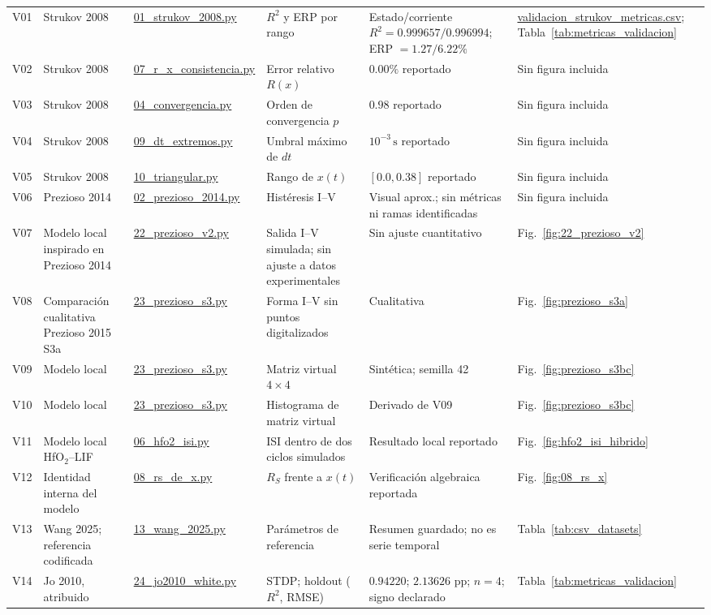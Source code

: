 {\begin{longtable}{c >{\raggedright\arraybackslash}p{2.1cm} >{\raggedright\arraybackslash}p{2.4cm} >{\raggedright\arraybackslash}p{2.0cm} >{\raggedright\arraybackslash}p{4.1cm} >{\raggedright\arraybackslash}p{2.2cm}}
V01 & Strukov 2008 & \url{01_strukov_2008.py} & $R^2$ y ERP por rango & Estado/corriente $R^2=0.999657/0.996994$; ERP $=1.27/6.22\%$ & \url{validacion_strukov_metricas.csv}; Tabla~\ref{tab:metricas_validacion} \\
V02 & Strukov 2008 & \url{07_r_x_consistencia.py} & Error relativo $R(x)$ & $0.00\%$ reportado & Sin figura incluida \\
V03 & Strukov 2008 & \url{04_convergencia.py} & Orden de convergencia $p$ & $0.98$ reportado & Sin figura incluida \\
V04 & Strukov 2008 & \url{09_dt_extremos.py} & Umbral máximo de $dt$ & $10^{-3}\,\mathrm{s}$ reportado & Sin figura incluida \\
V05 & Strukov 2008 & \url{10_triangular.py} & Rango de $x(t)$ & $[0.0,0.38]$ reportado & Sin figura incluida \\
V06 & Prezioso 2014 & \url{02_prezioso_2014.py} & Histéresis I--V & Visual aprox.; sin métricas ni ramas identificadas & Sin figura incluida \\
V07 & Modelo local inspirado en Prezioso 2014 & \url{22_prezioso_v2.py} & Salida I--V simulada; sin ajuste a datos experimentales & Sin ajuste cuantitativo & Fig.~\ref{fig:22_prezioso_v2} \\
V08 & Comparación cualitativa Prezioso 2015 S3a & \url{23_prezioso_s3.py} & Forma I--V sin puntos digitalizados & Cuali\-tativa & Fig.~\ref{fig:prezioso_s3a} \\
V09 & Modelo local & \url{23_prezioso_s3.py} & Matriz virtual $4\times4$ & Sintética; semilla 42 & Fig.~\ref{fig:prezioso_s3bc} \\
V10 & Modelo local & \url{23_prezioso_s3.py} & Histograma de matriz virtual & Derivado de V09 & Fig.~\ref{fig:prezioso_s3bc} \\
V11 & Modelo local HfO$_2$--LIF & \url{06_hfo2_isi.py} & ISI dentro de dos ciclos simulados & Resultado local reportado & Fig.~\ref{fig:hfo2_isi_hibrido} \\
V12 & Identidad interna del modelo & \url{08_rs_de_x.py} & $R_S$ frente a $x(t)$ & Verifi\-cación algebraica reportada & Fig.~\ref{fig:08_rs_x} \\
V13 & Wang 2025; referencia codificada & \url{13_wang_2025.py} & Parámetros de referencia & Resumen guardado; no es serie temporal & Tabla~\ref{tab:csv_datasets} \\
V14 & Jo 2010, atribuido & \url{24_jo2010_white.py} & STDP; holdout ($R^2$, RMSE) & $0.94220$; $2.13626$ pp; $n=4$; signo declarado & Tabla~\ref{tab:metricas_validacion} \\

\end{longtable}}
